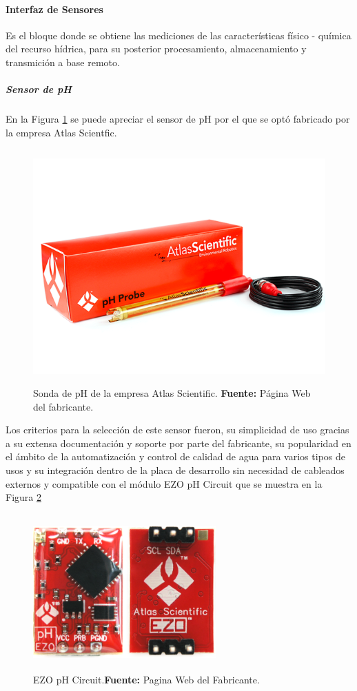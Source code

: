 \paragraph[Interfaz de Sensores]{Interfaz de Sensores}
Es el bloque donde se obtiene las mediciones de las caracter\'isticas f\'isico - qu\'imica del recurso h\'idrica, para su posterior procesamiento, almacenamiento y transmici\'on a base remoto.

\subparagraph{Sensor de pH}
En la Figura \ref{fig:4.8} se puede apreciar el sensor de pH por el que se optó fabricado por la empresa Atlas Scientfic.
    \begin{figure}[t]
    \centering
	\includegraphics[width=150mm, height=90mm]{Imagenes/2021/imag23.png}%
	\caption[Sonda de pH de la empresa Atlas Scientific]{Sonda de pH de la empresa Atlas Scientific. \textbf{Fuente:} Página Web del fabricante.}
	\label{fig:4.8}
    \end{figure}
Los criterios para la selección de este sensor fueron, su simplicidad de uso gracias a su extensa documentación y soporte por parte del fabricante, su popularidad en el ámbito de la automatización y control de calidad de agua para varios tipos de usos y su integración dentro de la placa de desarrollo sin necesidad de cableados externos y compatible con el módulo EZO pH Circuit que se muestra en la Figura \ref{fig:4.9}
\newline
\hfill
    \begin{figure}[H]
    \centering
	\includegraphics[width=70mm, height=60mm]{Imagenes/2021/imag27.png}%
	\caption[EZO pH Circuit]{EZO pH Circuit.\textbf{Fuente:} Pagina Web del Fabricante.}
	\label{fig:4.9}
    \end{figure}
